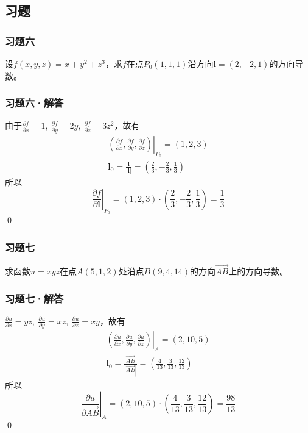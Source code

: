 \subsection{习题}
\begin{frame}
    \frametitle{习题六}

    设$f(x,y,z)=x+y^2+z^3$，求$f$在点$P_0(1,1,1)$沿方向$\boldsymbol{l}=(2,-2,1)$的方向导数。

\end{frame}

\begin{frame}
    \frametitle{习题六·解答}

    由于$\displaystyle\frac{\partial f}{\partial x}=1,\ \frac{\partial f}{\partial y}=2y,\ \frac{\partial f}{\partial z}=3z^2$，故有\pause
    \begin{gather*}
        \left.\left(\frac{\partial f}{\partial x},\frac{\partial f}{\partial y},\frac{\partial f}{\partial z}\right)\right|_{P_0}=(1,2,3)\\
        \boldsymbol{l}_0=\frac{\boldsymbol{l}}{|\boldsymbol{l}|}=\left(\frac{2}{3},-\frac{2}{3},\frac{1}{3}\right)
    \end{gather*}\pause
    所以
    $$\left.\frac{\partial f}{\partial \boldsymbol{l}}\right|_{P_0}=(1,2,3)\cdot \left(\frac{2}{3},-\frac{2}{3},\frac{1}{3}\right)=\frac{1}{3}$$
    \qed

\end{frame}

\begin{frame}
    \frametitle{习题七}

    求函数$u=xyz$在点$A(5,1,2)$处沿点$B(9,4,14)$的方向$\overrightarrow{AB}$上的方向导数。

\end{frame}

\begin{frame}
    \frametitle{习题七·解答}

    $\displaystyle\frac{\partial u}{\partial x}=yz,\ \frac{\partial u}{\partial y}=xz,\ \frac{\partial u}{\partial z}=xy$，故有\pause
    \begin{gather*}
        \left.\left(\frac{\partial u}{\partial x},\frac{\partial u}{\partial y},\frac{\partial u}{\partial z}\right)\right|_{A}=(2,10,5)\\
        \boldsymbol{l}_0=\frac{\overrightarrow{AB}}{|\overrightarrow{AB}|}=\left(\frac{4}{13},\frac{3}{13},\frac{12}{13}\right)
    \end{gather*}\pause
    所以
    $$\left.\frac{\partial u}{\partial \overrightarrow{AB}}\right|_{A}=(2,10,5)\cdot \left(\frac{4}{13},\frac{3}{13},\frac{12}{13}\right)=\frac{98}{13}$$
    \qed

\end{frame}